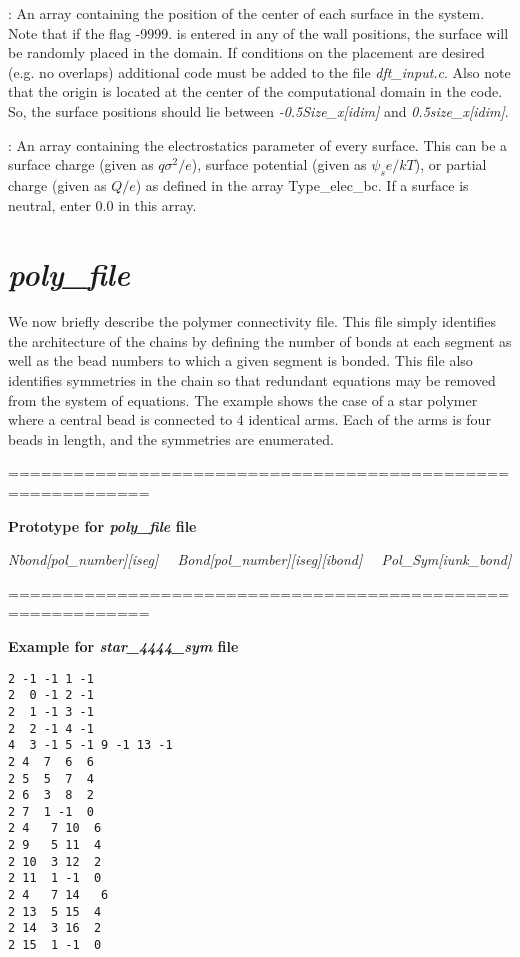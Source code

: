 \documentclass[10pt,onecolumn]{article}
\begin{document}
\vspace{0.1in}
:  An array containing the position of the center of
each surface in the system.  Note that if the flag -9999. is entered in any of the wall
positions, the surface will be randomly placed in the domain.  If conditions on the
placement are desired (e.g. no overlaps) additional code must be added to the
file {\it dft\_input.c}.  Also note that the origin is located at the center of the computational domain in the code.  So, the surface positions should lie between {\it -0.5Size\_x[idim]} and {\it 0.5size\_x[idim]}.

\vspace{0.1in}
:  An array containing the electrostatics parameter
of every surface.  This can be a surface charge (given as $q\sigma^2/e$), surface potential
(given as $\psi_s e/kT$), or partial charge
 (given as $Q/e$) as defined in the array Type\_elec\_bc.  If a surface is neutral, enter
 0.0 in this array.  

\vfill
\break

\section{{\it poly\_file}}
\label{sec:polyfile}
We now briefly describe the polymer connectivity file.  This file simply identifies the 
architecture of the chains by defining the number of bonds at each segment as well
as the bead numbers to which a given segment is bonded.  This file also identifies
symmetries in the chain so that redundant equations may be removed from the system
of equations.  The example shows the case of a star polymer
where a central bead is connected to 4 identical arms.  Each of the arms
is four beads in length, and the symmetries are enumerated.


\vspace{0.1in}
\noindent===========================================================

{\bf Prototype for {\it poly\_file} file}

{\it Nbond[pol\_number][iseg] \ \ Bond[pol\_number][iseg][ibond] \ \ Pol\_Sym[iunk\_bond] }

\noindent===========================================================

{\bf Example for {\it star\_4444\_sym} file}

\begin{verbatim}
2 -1 -1 1 -1
2  0 -1 2 -1
2  1 -1 3 -1
2  2 -1 4 -1
4  3 -1 5 -1 9 -1 13 -1
2 4  7  6  6
2 5  5  7  4
2 6  3  8  2
2 7  1 -1  0
2 4   7 10  6
2 9   5 11  4
2 10  3 12  2
2 11  1 -1  0
2 4   7 14   6
2 13  5 15  4
2 14  3 16  2
2 15  1 -1  0
\end{verbatim}
\end{document}
